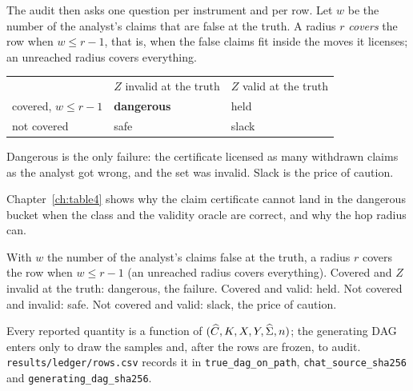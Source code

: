The audit then asks one question per instrument and per row. Let $w$ be the number of the analyst's
claims that are false at the truth. A radius $r$ \emph{covers} the row when $w \le r - 1$, that is, when
the false claims fit inside the moves it licenses; an unreached radius covers everything.

\begin{noprato}
\begin{tabular}{@{}lll@{}}
& $Z$ invalid at the truth & $Z$ valid at the truth \\
covered, $w \le r - 1$ & \textbf{dangerous} & held \\
not covered & safe & slack \\
\end{tabular}

\smallskip
Dangerous is the only failure: the certificate licensed as many withdrawn claims as the analyst got
wrong, and the set was invalid. Slack is the price of caution.
\end{noprato}

Chapter~\ref{ch:table4} shows why the claim certificate cannot land in the dangerous bucket when the
class and the validity oracle are correct, and why the hop radius can.

%
{With $w$ the number of the analyst's claims false at the truth, a radius $r$ covers the row when
$w \le r - 1$ (an unreached radius covers everything). Covered and $Z$ invalid at the truth: dangerous,
the failure. Covered and valid: held. Not covered and invalid: safe. Not covered and valid: slack, the
price of caution.}

%
{Every reported quantity is a function of $(\widehat{C}, K, X, Y, \widehat\Sigma, n)$; the generating DAG
enters only to draw the samples and, after the rows are frozen, to audit. \texttt{results/ledger/rows.csv}
records it in \texttt{true\_dag\_on\_path}, \texttt{chat\_source\_sha256} and
\texttt{generating\_dag\_sha256}.}


